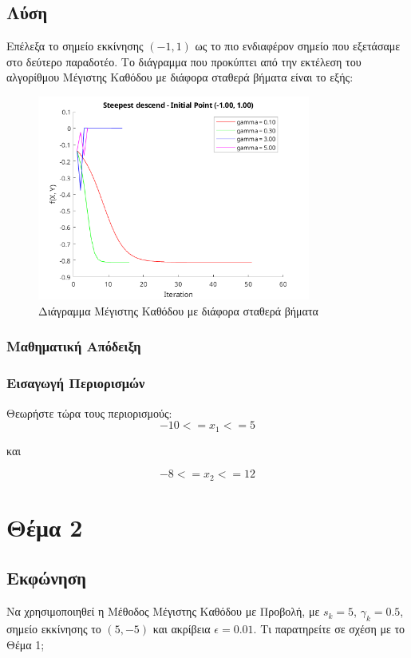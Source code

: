 \documentclass{report}
\begin{document}
\section{Λύση}
Επέλεξα το σημείο εκκίνησης $(-1,1)$ ως το πιο ενδιαφέρον σημείο που εξετάσαμε στο δεύτερο παραδοτέο.
Το διάγραμμα που προκύπτει από την εκτέλεση του αλγορίθμου Μέγιστης Καθόδου με διάφορα σταθερά βήματα είναι
το εξής:
\begin{figure}[H]
    \centering
    \includegraphics[width=0.8\textwidth]{media/thema1.png}
    \caption{Διάγραμμα Μέγιστης Καθόδου με διάφορα σταθερά βήματα}
\end{figure}

\subsection{Μαθηματική Απόδειξη}


\subsection{Εισαγωγή Περιορισμών}
Θεωρήστε τώρα τους περιορισμούς:
$$-10 <= x_1 <= 5$$  
\begin{center}
    και
\end{center}
$$-8 <= x_2 <= 12$$

% 
\chapter{Θέμα 2}
\section{Εκφώνηση}
Να χρησιμοποιηθεί η Μέθοδος Μέγιστης Καθόδου με Προβολή, με $s_k = 5$, $\gamma_k = 0.5$,
σημείο εκκίνησης το $(5, -5)$ και ακρίβεια $\epsilon = 0.01$. Τι παρατηρείτε σε σχέση με το 
Θέμα 1;
\end{document}
